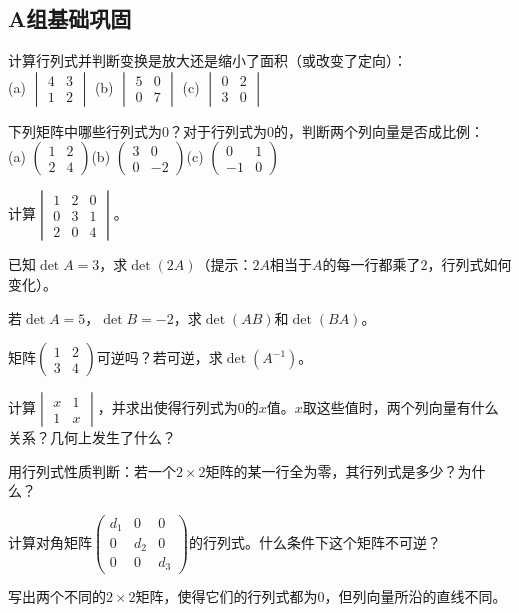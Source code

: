 \subsection*{A组\quad 基础巩固}
\begin{exercise}
\item 计算行列式并判断变换是放大还是缩小了面积（或改变了定向）：\\[2pt]
(a) $\begin{vmatrix}4&3\\1&2\end{vmatrix}$\quad
(b) $\begin{vmatrix}5&0\\0&7\end{vmatrix}$\quad
(c) $\begin{vmatrix}0&2\\3&0\end{vmatrix}$
\item 下列矩阵中哪些行列式为$0$？对于行列式为$0$的，判断两个列向量是否成比例：\\
(a) $\begin{pmatrix}1&2\\2&4\end{pmatrix}$\quad (b) $\begin{pmatrix}3&0\\0&-2\end{pmatrix}$\quad (c) $\begin{pmatrix}0&1\\-1&0\end{pmatrix}$
\item 计算$\begin{vmatrix}1&2&0\\0&3&1\\2&0&4\end{vmatrix}$。
\item 已知$\det A=3$，求$\det(2A)$（提示：$2A$相当于$A$的每一行都乘了$2$，行列式如何变化）。
\item 若$\det A=5$，$\det B=-2$，求$\det(AB)$和$\det(BA)$。
\item 矩阵$\begin{pmatrix}1&2\\3&4\end{pmatrix}$可逆吗？若可逆，求$\det(A^{-1})$。
\item 计算$\begin{vmatrix}x&1\\1&x\end{vmatrix}$，并求出使得行列式为$0$的$x$值。$x$取这些值时，两个列向量有什么关系？几何上发生了什么？
\item 用行列式性质判断：若一个$2\times2$矩阵的某一行全为零，其行列式是多少？为什么？
\item 计算对角矩阵$\begin{pmatrix}d_1&0&0\\0&d_2&0\\0&0&d_3\end{pmatrix}$的行列式。什么条件下这个矩阵不可逆？
\item 写出两个不同的$2\times2$矩阵，使得它们的行列式都为$0$，但列向量所沿的直线不同。
\end{exercise}

